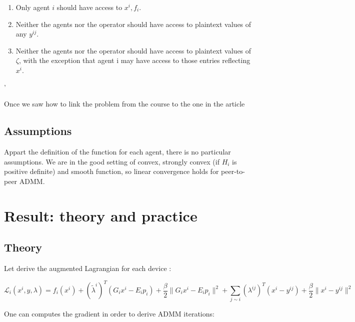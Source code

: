 \documentclass[10pt,english]{article}
\begin{document}
\begin{enumerate}
    \item Only agent $i$ should have access to $x^i,f_i $.
    \item  Neither the agents nor the operator should have access to plaintext values of any $y^{ij}$.        
    \item Neither the agents nor the operator should have access to plaintext values of $\zeta$, with the exception that agent i may have access to those entries reflecting $x^i$.
\end{enumerate}'

Once we saw how to link the problem from the course to the one in the article

\subsection{Assumptions}


Appart the definition of the function for each agent, there is no particular assumptions. We are in the 
good setting of convex, strongly convex (if $H_i$ is positive definite) and smooth function, so linear convergence
holds for peer-to-peer ADMM.


\section{Result: theory and practice}

\subsection{Theory}


Let derive the augmented Lagrangian for each device : 

\begin{equation}
    \mathcal{L}_i(x^i, y, \lambda) = f_i(x^i)+(\tilde\lambda^i)^T(G_ix^i-E_ip_i)+\dfrac{\beta}{2}\lVert G_ix^i-E_ip_i\rVert^2 + \sum_{j\sim i}(\lambda^{ij})^T (x^i-y^{ij})+\dfrac{\beta}{2}\lVert x^i-y^{ij}\rVert^2
\end{equation}

One can computes the gradient in order to derive ADMM iterations:
\end{document}
